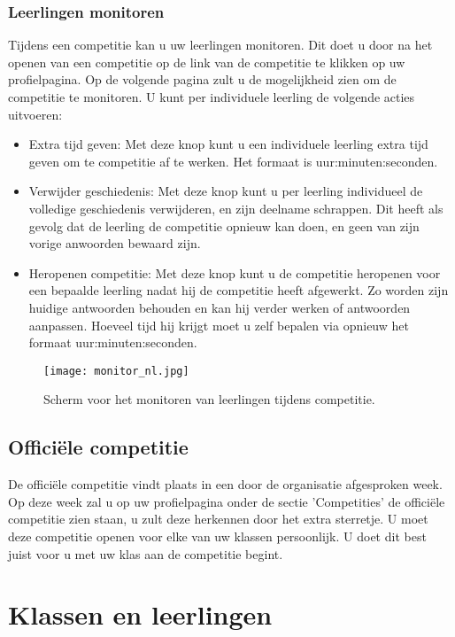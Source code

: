 \documentclass[11pt,a4paper]{report}
\begin{document}
\subsubsection{Leerlingen monitoren}
Tijdens een competitie kan u uw leerlingen monitoren. Dit doet u door na het openen van een competitie op de link van de competitie te klikken op uw profielpagina. Op de volgende pagina zult u de mogelijkheid zien om de competitie te monitoren. U kunt per individuele leerling de volgende acties uitvoeren:
\begin{itemize}
	\item Extra tijd geven: Met deze knop kunt u een individuele leerling extra tijd geven om te competitie af te werken. Het formaat is uur:minuten:seconden.
	\item Verwijder geschiedenis: Met deze knop kunt u per leerling individueel de volledige geschiedenis verwijderen, en zijn deelname schrappen. Dit heeft als gevolg dat de leerling de competitie opnieuw kan doen, en geen van zijn vorige anwoorden bewaard zijn. 
	\item Heropenen competitie: Met deze knop kunt u de competitie heropenen voor een bepaalde leerling nadat hij de competitie heeft afgewerkt. Zo worden zijn huidige antwoorden behouden en kan hij verder werken of antwoorden aanpassen. Hoeveel tijd hij krijgt moet u zelf bepalen via opnieuw het formaat uur:minuten:seconden.
\end{itemize}

\begin{figure}[h!]
\centering
\texttt{[image: monitor\_nl.jpg]}
\caption{Scherm voor het monitoren van leerlingen tijdens competitie.}
\label{fig:monitor}
\end{figure}


\subsection{Offici\"ele competitie}
De offici\"ele competitie vindt plaats in een door de organisatie afgesproken week. Op deze week zal u op uw profielpagina onder de sectie 'Competities' de offici\"ele competitie zien staan, u zult deze herkennen door het extra sterretje. U moet deze competitie openen voor elke van uw klassen persoonlijk. U doet dit best juist voor u met uw klas aan de competitie begint. 

\section{Klassen en leerlingen}
\end{document}
